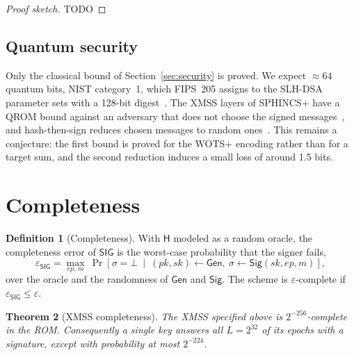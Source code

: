 \documentclass[11pt]{article}
\theoremstyle{definition}
\newtheorem{definition}{Definition}[section]
\theoremstyle{plain}
\newtheorem{theorem}[definition]{Theorem}
\theoremstyle{remark}
\newcommand{\Gen}{\mathsf{Gen}}
\newcommand{\Sig}{\mathsf{Sig}}
\newcommand{\SIG}{\mathsf{SIG}}
\newcommand{\hash}{\mathsf{H}}
\newcommand{\ep}{\mathit{ep}}
\newcommand{\sk}{\mathit{sk}}
\newcommand{\pk}{\mathit{pk}}
\begin{document}
\begin{proof}[Proof sketch]
TODO
\end{proof}

\subsection{Quantum security}
\label{sec:quantum}

Only the classical bound of Section~\ref{sec:security} is proved. We expect $\approx64$ quantum bits, NIST category~1, which FIPS~205 assigns to the SLH-DSA parameter sets with a 128-bit digest~\cite{FIPS205}. The XMSS layers of SPHINCS+ have a QROM bound against an adversary that does not choose the signed messages~\cite{HK22}, and hash-then-sign reduces chosen messages to random ones~\cite{GHHM21}. This remains a conjecture: the first bound is proved for the WOTS+ encoding rather than for a target sum, and the second reduction induces a small loss of around 1.5 bits.

\section{Completeness}

\begin{definition}[Completeness]
With $\hash$ modeled as a random oracle, the completeness error of $\SIG$ is the worst-case probability that the signer fails,
\[
  \varepsilon_{\SIG}=\max_{\ep,\,m}\ \Pr\!\left[\sigma=\bot\ \middle|\ (\pk,\sk)\gets\Gen,\ \sigma\gets\Sig(\sk,\ep,m)\right],
\]
over the oracle and the randomness of $\Gen$ and $\Sig$. The scheme is $\varepsilon$-complete if $\varepsilon_{\SIG}\leq\varepsilon$.
\end{definition}

\begin{theorem}[XMSS completeness]
The XMSS specified above is $2^{-256}$-complete in the ROM. Consequently a single key answers all $L=2^{32}$ of its epochs with a signature, except with probability at most $2^{-224}$.
\end{theorem}
\end{document}
